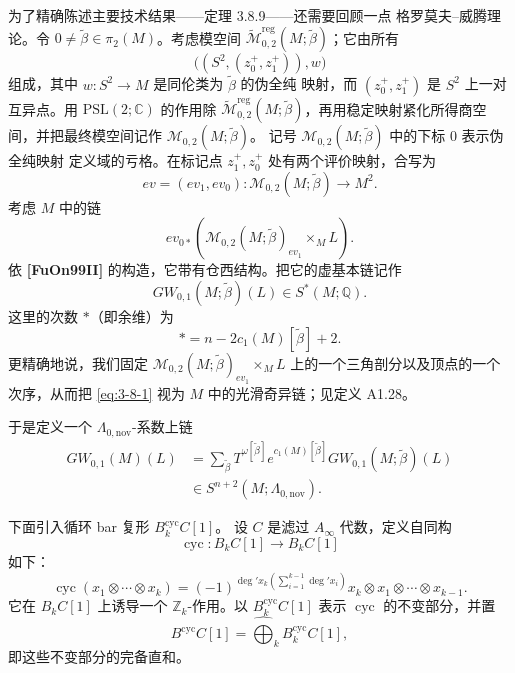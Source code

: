 为了精确陈述主要技术结果——定理 3.8.9——还需要回顾一点
格罗莫夫--威腾理论。令
$0\ne\widetilde\beta\in\pi_2(M)$。考虑模空间
$\widetilde{\mathcal M}^{\mathrm{reg}}_{0,2}
(M;\widetilde\beta)$；它由所有
\[
 \bigl((S^2,(z_0^+,z_1^+)),w\bigr)
\]
组成，其中 $w\colon S^2\to M$ 是同伦类为 $\widetilde\beta$ 的伪全纯
映射，而 $(z_0^+,z_1^+)$ 是 $S^2$ 上一对互异点。用
$\mathrm{PSL}(2;\mathbb C)$ 的作用除
$\widetilde{\mathcal M}^{\mathrm{reg}}_{0,2}
(M;\widetilde\beta)$，再用稳定映射紧化所得商空间，并把最终模空间记作
$\mathcal M_{0,2}(M;\widetilde\beta)$。
记号 $\mathcal M_{0,2}(M;\widetilde\beta)$ 中的下标 $0$ 表示伪全纯映射
定义域的亏格。在标记点 $z_1^+,z_0^+$ 处有两个评价映射，合写为
\[
 ev=(ev_1,ev_0)\colon
 \mathcal M_{0,2}(M;\widetilde\beta)\longrightarrow M^2.
\]
考虑 $M$ 中的链
\begin{equation}
 ev_{0*}\left(
 \mathcal M_{0,2}(M;\widetilde\beta)_{ev_1}
 \mathbin{\times_M}L
 \right).
\tag{3.8.1}\label{eq:3-8-1}
\end{equation}
依 \textbf{[FuOn99II]} 的构造，它带有仓西结构。把它的虚基本链记作
\[
 GW_{0,1}(M;\widetilde\beta)(L)
 \in S^*(M;\mathbb Q).
\]
这里的次数 $*$（即余维）为
\[
 *=n-2c_1(M)[\widetilde\beta]+2.
\]
更精确地说，我们固定
$\mathcal M_{0,2}(M;\widetilde\beta)_{ev_1}\mathbin{\times_M}L$
上的一个三角剖分以及顶点的一个次序，从而把
\eqref{eq:3-8-1} 视为 $M$ 中的光滑奇异链；见定义 A1.28。

于是定义一个 $\Lambda_{0,\mathrm{nov}}$-系数上链
\begin{equation}
\begin{aligned}
 GW_{0,1}(M)(L)
 &=
 \sum_{\widetilde\beta}
 T^{\omega[\widetilde\beta]}
 e^{c_1(M)[\widetilde\beta]}
 GW_{0,1}(M;\widetilde\beta)(L)\\
 &\in S^{n+2}(M;\Lambda_{0,\mathrm{nov}}).
\end{aligned}
\tag{3.8.2}\label{eq:3-8-2}
\end{equation}

下面引入循环 bar 复形
$B_k^{\mathrm{cyc}}C[1]$。
设 $C$ 是滤过 $A_\infty$ 代数，定义自同构
\[
 \operatorname{cyc}\colon B_kC[1]\longrightarrow B_kC[1]
\]
如下：
\[
 \operatorname{cyc}(x_1\otimes\cdots\otimes x_k)
 =
 (-1)^{
  \deg' x_k\left(\sum_{i=1}^{k-1}\deg' x_i\right)}
 x_k\otimes x_1\otimes\cdots\otimes x_{k-1}.
\]
它在 $B_kC[1]$ 上诱导一个 $\mathbb Z_k$-作用。以
$B_k^{\mathrm{cyc}}C[1]$ 表示 $\operatorname{cyc}$ 的不变部分，并置
\[
 B^{\mathrm{cyc}}C[1]
 =
 \widehat{\bigoplus}_{k}B_k^{\mathrm{cyc}}C[1],
\]
即这些不变部分的完备直和。


